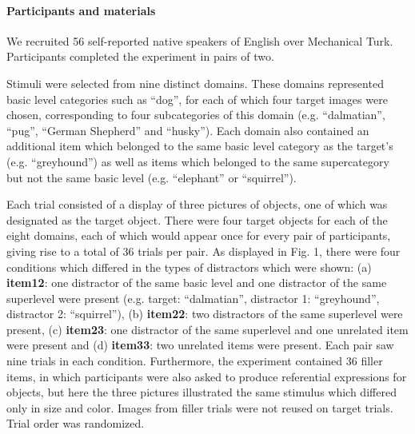 \documentclass[10pt,letterpaper]{article}
\newcommand{\ndg}[1]{\textcolor{Green}{[ndg: #1]}}
\begin{document}

\paragraph{Participants and materials}
We recruited 56 self-reported native speakers of English over Mechanical Turk. Participants completed the experiment in pairs of two.

Stimuli were selected from nine distinct domains. These domains represented basic level categories such as ``dog'', for each of which four target images were chosen, corresponding to four subcategories of this domain (e.g. ``dalmatian'', ``pug'', ``German Shepherd'' and ``husky''). Each domain also contained an additional item which belonged to the same basic level category as the target's (e.g. ``greyhound'') as well as items which belonged to the same supercategory but not the same basic level (e.g. ``elephant'' or ``squirrel''). 

Each trial consisted of a display of three pictures of objects, one of which was designated as the target object. There were four target objects for each of the eight domains, each of which would appear once for every pair of participants, giving rise to a total of 36 trials per pair. As displayed in Fig. 1, there were four conditions which differed in the types of distractors which were shown: (a) \textbf{item12}: one distractor of the same basic level and one distractor of the same superlevel were present (e.g. target: ``dalmatian'', distractor 1: ``greyhound'', distractor 2: ``squirrel''), (b) \textbf{item22}: two distractors of the same superlevel were present, (c) \textbf{item23}: one distractor of the same superlevel and one unrelated item were present and (d) \textbf{item33}: two unrelated items were present. Each pair saw nine trials in each condition. Furthermore, the experiment contained 36 filler items, in which participants were also asked to produce referential expressions for objects, but here the three pictures illustrated the same stimulus which differed only in size and color. Images from filler trials were not reused on target trials. Trial order was randomized. 
\end{document}
